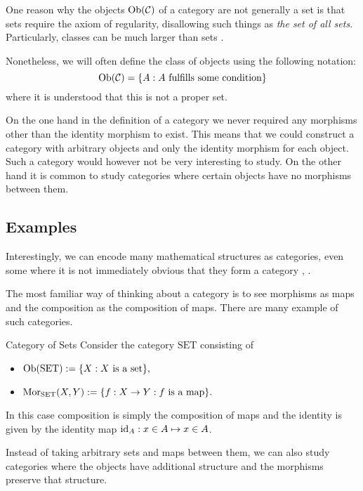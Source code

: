One reason why the objects $\mathrm {Ob}(\mathcal{C})$ of a category are not generally a set is that sets require the axiom of regularity, 
disallowing such things as \emph{the set of all sets}. Particularly, classes can be much larger than sets \cite[p.~1]{Roman2017}.

Nonetheless, we will often define the class of objects using the following notation:
$$
\mathrm {Ob}(\mathcal{C}) = \{A: \text{$A$ fulfills some condition}\}
$$
where it is understood that this is not a proper set.


On the one hand in the definition of a category we never required any morphisms other than the identity morphism to exist.
This means that we could construct a category with arbitrary objects and only the identity morphism for each object. 
Such a category would however not be very interesting to study.
On the other hand it is common to study categories where certain objects have no morphisms between them.

\subsection{Examples}

Interestingly, we can encode many mathematical structures as categories, even some where it is not immediately obvious that they form a category \cite[Chap.~1~Ex.~1-7]{Roman2017}, \cite[Sec.~1.1]{Leinster2014-dc}.

The most familiar way of thinking about a category is to see morphisms as maps and the composition as the composition of maps. There are many example of such categories.

\begin{example}{Category of Sets}{}
Consider the category $\mathrm{SET}$ consisting of
\begin{itemize}
    \item $\mathrm {Ob}(\mathrm{SET}) := \{X: \text{$X$ is a set}\},$
    \item $\mathrm {Mor}_{\mathrm{SET}}(X,Y) := \{f: X \to Y: \text{$f$ is a map}\}.$
\end{itemize}
In this case composition is simply the composition of maps and the identity is given by the identity map $\mathrm{id}_A: x \in A \mapsto x \in A$.
\end{example}

Instead of taking arbitrary sets and maps between them, we can also study categories where the objects have additional structure and the morphisms preserve that structure.

